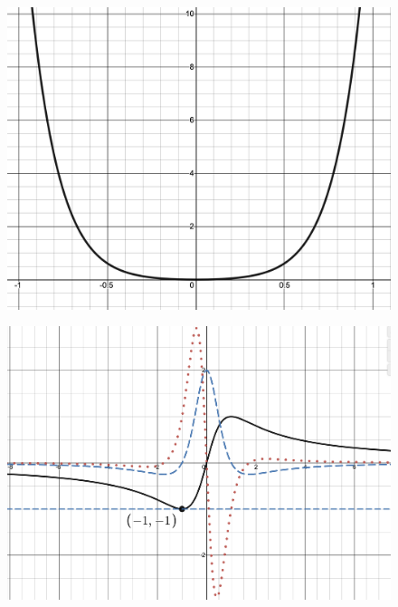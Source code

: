 \vspace{0.6in}
\newpage
 \begin{figure}[h!]
 \centering
    \includegraphics[scale=0.35]{images/productQuotient/11_1.png}
    \caption{}
    \end{figure}
    
    \begin{figure}[h!]
 \centering
    \includegraphics[scale=0.35]{images/productQuotient/11_2.png}
    \caption{}
    \end{figure}
\newpage
